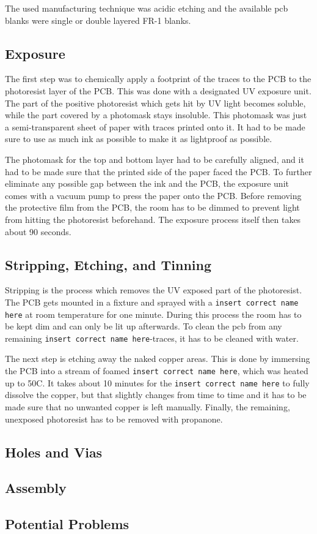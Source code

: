 The used manufacturing technique was acidic etching %
and the available \gls{pcb} blanks were single or double layered FR-1 blanks. %

\subsection{Exposure}

The first step was to chemically apply a footprint of the traces to the PCB to the photoresist layer of the PCB. This was done with a designated UV exposure unit. The part of the positive photoresist which gets hit by UV light becomes soluble, while the part covered by a photomask stays insoluble. This photomask was just a semi-transparent sheet of paper with traces printed onto it. It had to be made sure to use as much ink as possible to make it as lightproof as possible.

The photomask for the top and bottom layer had to be carefully aligned, and it had to be made sure that the printed side of the paper faced the PCB. To further eliminate any possible gap between the ink and the PCB, the exposure unit comes with a vacuum pump to press the paper onto the PCB. Before removing the protective film from the PCB, the room has to be dimmed to prevent light from hitting the photoresist beforehand. The exposure process itself then takes about 90 seconds.

\subsection{Stripping, Etching, and Tinning}

Stripping is the process which removes the UV exposed part of the photoresist. The PCB gets mounted in a fixture and sprayed with a \texttt{insert correct name here} at room temperature for one minute. During this process the room has to be kept dim and can only be lit up afterwards. To clean the \gls{pcb} from any remaining \texttt{insert correct name here}-traces, it has to be cleaned with water. %

The next step is etching away the naked copper areas. This is done by immersing the PCB into a stream of foamed \texttt{insert correct name here}, which was heated up to 50\textdegree C. It takes about 10 minutes for the \texttt{insert correct name here} to fully dissolve the copper, but that slightly changes from time to time and it has to be made sure that no unwanted copper is left manually. Finally, the remaining, unexposed photoresist has to be removed with propanone.


\subsection{Holes and Vias}

\subsection{Assembly}

\subsection{Potential Problems}